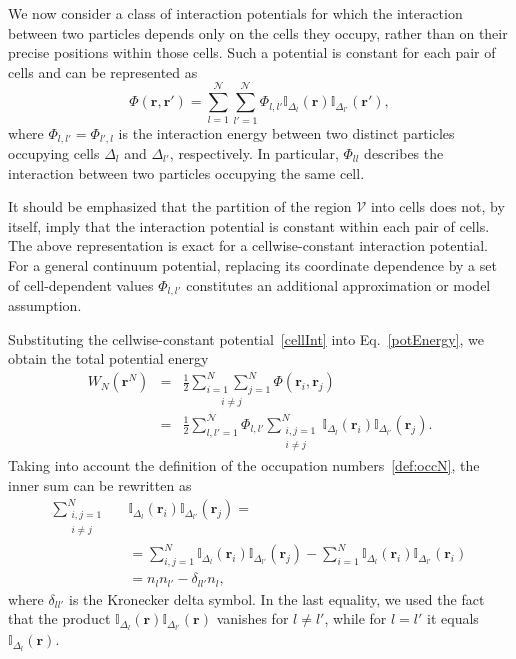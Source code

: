 \documentclass[12pt]{article}
\begin{document}
	We now consider a class of interaction potentials for which the interaction between two particles depends only on the cells they occupy, rather than on their precise positions within those cells. Such a potential is constant for each pair of cells and can be represented as
	\begin{equation}
		\label{cellInt}
		\Phi(\mathbf{r}, \mathbf{r}') = \sum_{l=1}^{\mathcal{N}} \sum_{l'=1}^{\mathcal{N}} \Phi_{l, {l'}} \mathbb{I}_{\Delta_{l}}(\mathbf{r}) \mathbb{I}_{\Delta_{l'}}(\mathbf{r}'),
	\end{equation}
	where $\Phi_{l, {l'}} = \Phi_{{l'}, {l}}$ is the interaction energy between two distinct particles occupying cells $\Delta_{l}$ and $\Delta_{l'}$, respectively. In particular, $\Phi_{ll}$ describes the interaction between two particles occupying the same cell.
	
	It should be emphasized that the partition of the region $\mathcal{V}$ into cells does not, by itself, imply that the interaction potential is constant within each pair of cells. The above representation is exact for a cellwise-constant interaction potential. For a general continuum potential, replacing its coordinate dependence by a set of cell-dependent values $\Phi_{l, {l'}}$ constitutes an additional approximation or model assumption.
	
	Substituting the cellwise-constant potential~\eqref{cellInt} into Eq.~\eqref{potEnergy}, we obtain the total potential energy
	\begin{eqnarray}
		W_N(\mathbf{r}^N) & = & \frac{1}{2} \underset{i\neq j}{\sum_{i=1}^{N} \sum_{j = 1}^{N}} \Phi(\mathbf{r}_i, \mathbf{r}_j)
		\nonumber\\
		& = & \frac{1}{2} \sum_{l,l' = 1}^{\mathcal{N}} \Phi_{l, {l'}} \sum_{\substack{i,j=1 \\ i \ne j}}^{N} \mathbb{I}_{\Delta_{l}}(\mathbf{r}_i) \mathbb{I}_{\Delta_{l'}}(\mathbf{r}_j).
	\end{eqnarray}
	Taking into account the definition of the occupation numbers~\eqref{def:occN}, the inner sum can be rewritten as
	\begin{eqnarray}
		\sum_{\substack{i,j=1 \\ i \ne j}}^{N} && \mathbb{I}_{\Delta_{l}}(\mathbf{r}_i) \mathbb{I}_{\Delta_{l'}}(\mathbf{r}_j) = 
		\nonumber \\
		&& = \sum_{i,j=1}^{N} \mathbb{I}_{\Delta_{l}}(\mathbf{r}_i) \mathbb{I}_{\Delta_{l'}}(\mathbf{r}_j) - \sum_{i=1}^N \mathbb{I}_{\Delta_{l}}(\mathbf{r}_i) \mathbb{I}_{\Delta_{l'}}(\mathbf{r}_i)
		\nonumber\\
		&& = n_l n_{l'} - \delta_{ll'} n_l,
	\end{eqnarray}
	where $\delta_{ll'}$ is the Kronecker delta symbol. In the last equality, we used the fact that the product $\mathbb{I}_{\Delta_{l}}(\mathbf{r}) \mathbb{I}_{\Delta_{l'}}(\mathbf{r})$ vanishes for $l \ne l'$, while for $l=l'$ it equals $\mathbb{I}_{\Delta_{l}}(\mathbf{r})$.
	
\end{document}
